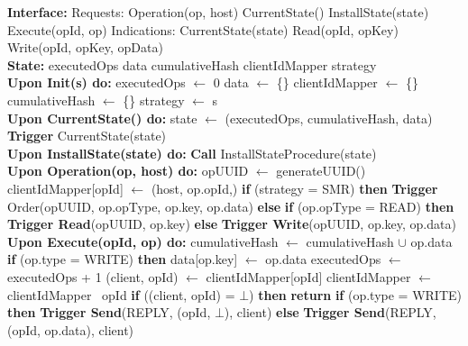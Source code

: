 \documentclass[sigconf]{acmart}
\begin{document}
\begin{algorithmic}[1]
\small

\State \textbf{Interface:}
\State \quad Requests:
\State \quad \quad Operation(op, host)
\State \quad \quad CurrentState()
\State \quad \quad InstallState(state)
\State \quad \quad Execute(opId, op)
\State \quad Indications:
\State \quad \quad CurrentState(state)
\State \quad \quad Read(opId, opKey)
\State \quad \quad Write(opId, opKey, opData)\\

\State \textbf{State:}
\State \quad executedOps 
\State \quad data 
\State \quad cumulativeHash
\State \quad clientIdMapper 
\State \quad strategy  \\

\State \textbf{Upon Init(s) do:}
\State \quad executedOps $\gets$ 0
\State \quad data $\gets$ \{\}
\State \quad clientIdMapper $\gets$ \{\}
\State \quad cumulativeHash $\gets$ \{\}
\State \quad strategy $\gets$ s \\

\State \textbf{Upon CurrentState() do:}
\State \quad state $\gets$ (executedOps, cumulativeHash, data)
\State \quad \textbf{Trigger} CurrentState(state) \\

\State \textbf{Upon InstallState(state) do:}
\State \quad \textbf{Call} InstallStateProcedure(state) \\

\State \textbf{Upon Operation(op, host) do:}
\State \quad opUUID $\gets$ generateUUID()
\State \quad clientIdMapper[opId] $\gets$ {(host, op.opId,)}
\State \quad \textbf{if} (strategy = SMR) \textbf{then}
\State \quad \quad \textbf{Trigger} Order(opUUID, op.opType, op.key, op.data)
\State \quad \textbf{else}
\State \quad \quad \textbf{if} (op.opType = READ) \textbf{then}
\State \quad \quad \quad \textbf{Trigger Read}(opUUID, op.key)
\State \quad \quad \textbf{else}
\State \quad \quad \quad \textbf{Trigger Write}(opUUID, op.key, op.data) \\

\State \textbf{Upon Execute(opId, op) do:}
\State \quad cumulativeHash $\gets$ cumulativeHash $\cup$ {op.data}
\State \quad \textbf{if} (op.type = WRITE) \textbf{then}
\State \quad \quad data[op.key] $\gets$ op.data 
\State \quad executedOps $\gets$ executedOps + 1
\State \quad (client, opId) $\gets$ clientIdMapper[opId]
\State \quad clientIdMapper $\gets$ clientIdMapper \ {opId}
\State \quad \textbf{if} ((client, opId) = $\bot$) \textbf{then}
\State \quad \quad \textbf{return}
\State \quad \textbf{if} (op.type = WRITE) \textbf{then}
\State \quad \quad \textbf{Trigger Send}(REPLY, (opId, $\bot$), client)
\State \quad \textbf{else}
\State \quad \quad \textbf{Trigger Send}(REPLY, (opId, op.data), client) \\


\end{algorithmic}
\end{document}
